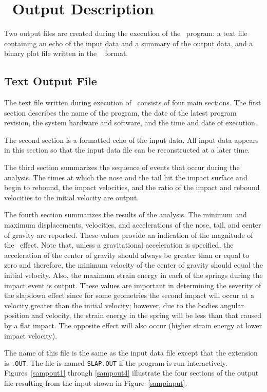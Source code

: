 \section{\SLAP\  Output Description}

Two output files are created during the execution of the \SLAP\ program:
a text file containing an echo of the input data and a summary of the
output data, and a binary plot file written in the \EXO~\cite{EXODUS}
format. 

\subsection{Text Output File}

The text file written during execution of \SLAP\  consists
of four main sections.  The first section describes the name of the
program, the date of the latest program revision, the system hardware
and software, and the time and date of execution. 

The second section is a formatted echo of the input data. All input data
appears in this section so that the input data file can be reconstructed
at a later time. 

The third section summarizes the sequence of events that occur during
the analysis.  The times at which the nose and the tail hit the impact
surface and begin to rebound, the impact velocities, and the ratio
of the impact and rebound velocities to the initial velocity are output.

The fourth section summarizes the results of the analysis.  The minimum and
maximum displacements, velocities, and accelerations of the nose, tail, and
center of gravity are reported.  These values provide an indication of the
magnitude of the \SLAP\  effect.  Note that, unless a gravitational
acceleration is specified, the acceleration of the center of gravity should
always be greater than or equal to zero and therefore, the minimum velocity of
the center of gravity should equal the initial velocity.  Also, the maximum
strain energy in each of the springs during the impact event is output. These
values are important in determining the severity of the slapdown effect since
for some geometries the second impact will occur at a velocity greater than the
initial velocity; however, due to the bodies angular position and velocity, the
strain energy in the spring will be less than that caused by a flat impact. 
The opposite effect will also occur (higher strain energy at lower impact
velocity).


The name of this file is the same as the input data file except that the
extension is {\tt .OUT}.   The file is named {\tt SLAP.OUT} if the program is
run interactively.  Figures~\ref{sampout1} through \ref{sampout4} illustrate
the four sections of the output file resulting from the input shown in
Figure~\ref{sampinput}. 


